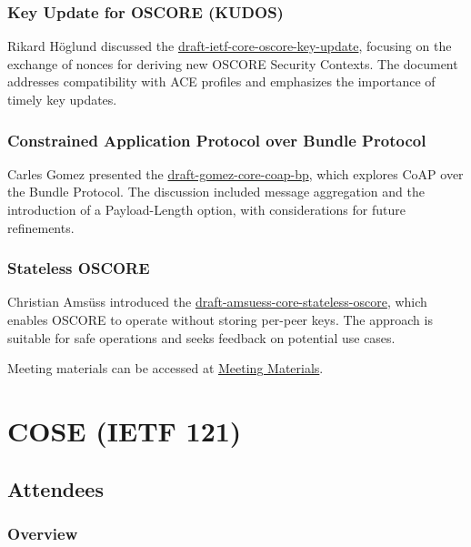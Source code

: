 \documentclass{article}
\begin{document}
\subsubsection{Key Update for OSCORE (KUDOS)}
Rikard Höglund discussed the \href{https://datatracker.ietf.org/doc/html/draft-ietf-core-oscore-key-update}{draft-ietf-core-oscore-key-update}, focusing on the exchange of nonces for deriving new OSCORE Security Contexts. The document addresses compatibility with ACE profiles and emphasizes the importance of timely key updates.

\subsubsection{Constrained Application Protocol over Bundle Protocol}
Carles Gomez presented the \href{https://datatracker.ietf.org/doc/html/draft-gomez-core-coap-bp}{draft-gomez-core-coap-bp}, which explores CoAP over the Bundle Protocol. The discussion included message aggregation and the introduction of a Payload-Length option, with considerations for future refinements.

\subsubsection{Stateless OSCORE}
Christian Amsüss introduced the \href{https://datatracker.ietf.org/doc/html/draft-amsuess-core-stateless-oscore}{draft-amsuess-core-stateless-oscore}, which enables OSCORE to operate without storing per-peer keys. The approach is suitable for safe operations and seeks feedback on potential use cases.

Meeting materials can be accessed at \href{https://datatracker.ietf.org/meeting/121/session/core}{Meeting Materials}.



\newpage

\section{COSE (IETF 121)}

\subsection{Attendees}

\subsubsection{Overview}
\end{document}
